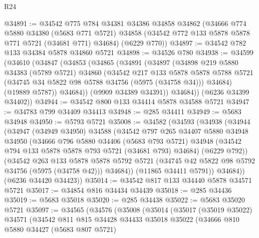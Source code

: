 \begin{lexlean}{R24}
\begin{coremodule}
@34891 := @34542
    @775
    @784
    @34381
    @34386
    @34858
    @34862
    (@34666
      @774
      @5880
      @34380
      (@5683 @771 @5721)
      @34858
      (@34542 @772 @133 @5878 @5878 @771 @5721 (@34681 @771) @34684)
      (@6229 @770))
@34897 := @34542 @782 @133 @34384 @5878 @34860 @5721
@34898 := @34526 @780
@34938 := @34599
    (@34610
      (@34847
        (@34853
          (@34865
            (@34891
              (@34897
                (@34898
                  @219
                  @5880
                  @34383
                  (@5789 @5721)
                  @34860
                  (@34542
                    @217
                    @133
                    @5878
                    @5878
                    @5788
                    @5721
                    (@34745 @34 @5822 @98 @5788 @34756 (@5975 (@34758 @34)))
                    @34684)
                  (@19889 @5787))
                @34684))
            (@9909 @34389 @34391))
          @34684))
      (@6236 @34399 @34402))
@34944 := @34542 @800 @133 @34414 @5878 @34588 @5721
@34947 := @34783 @799 @34409 @34413
@34948 := @285 @34411
@34949 := @5683 @34948
@34950 := @5793 @5721
@35008 := @34582
    (@34593
      (@34938
        (@34944
          (@34947
            (@34949 @34950)
            @34588
            (@34542
              @797
              @265
              @34407
              @5880
              @34948
              @34950
              (@34666
                @796
                @5880
                @34406
                (@5683 @793 @5721)
                @34948
                (@34542 @794 @133 @5878 @5878 @793 @5721 (@34681 @793) @34684)
                (@6229 @792))
              (@34542
                @263
                @133
                @5878
                @5878
                @5792
                @5721
                (@34745 @42 @5822 @98 @5792 @34756 (@5975 (@34758 @42)))
                @34684))
            (@11865 @34411 @5791))
          @34684))
      (@6236 @34420 @34423))
@35014 := @34542 @817 @133 @34440 @5878 @34571 @5721
@35017 := @34854 @816 @34434 @34439
@35018 := @285 @34436
@35019 := @5683 @35018
@35020 := @285 @34438
@35022 := @5683 @35020 @5721
@35097 := @34565
    (@34576
      (@35008
        (@35014
          (@35017
            (@35019 @35022)
            @34571
            (@34542
              @811
              @815
              @34428
              @34433
              @35018
              @35022
              (@34666
                @810
                @5880
                @34427
                (@5683 @807 @5721)

\end{coremodule}
\end{lexlean}
